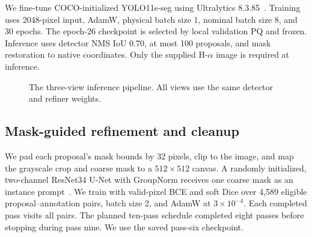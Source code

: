 \documentclass[sigconf]{acmart}
\begin{document}
We fine-tune COCO-initialized YOLO11s-seg using Ultralytics 8.3.85~\cite{yolo11}. Training uses 2048-pixel input, AdamW, physical batch size 1, nominal batch size 8, and 30 epochs. The epoch-26 checkpoint is selected by local validation PQ and frozen. Inference uses detector NMS IoU 0.70, at most 100 proposals, and mask restoration to native coordinates. Only the supplied H-$\alpha$ image is required at inference.

\begin{figure}[t]
\centering
{}
\caption{The three-view inference pipeline. All views use the same detector and refiner weights.}
\end{figure}

\subsection{Mask-guided refinement and cleanup}
We pad each proposal's mask bounds by 32 pixels, clip to the image, and map the grayscale crop and coarse mask to a $512\times512$ canvas. A randomly initialized, two-channel ResNet34 U-Net with GroupNorm receives one coarse mask as an instance prompt~\cite{resnet,unet}. We train with valid-pixel BCE and soft Dice over 4,589 eligible proposal--annotation pairs, batch size 2, and AdamW at $3\times10^{-4}$. Each completed pass visits all pairs. The planned ten-pass schedule completed eight passes before stopping during pass nine. We use the saved pass-six checkpoint.
\end{document}
